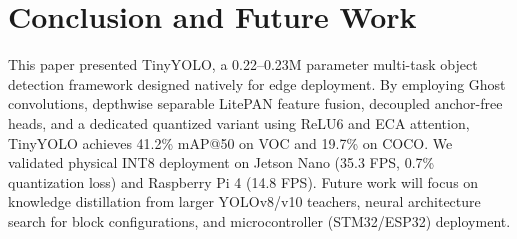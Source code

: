\documentclass[conference]{IEEEtran}
\begin{document}
\section{Conclusion and Future Work}
This paper presented TinyYOLO, a 0.22--0.23M parameter multi-task object detection framework designed natively for edge deployment. By employing Ghost convolutions, depthwise separable LitePAN feature fusion, decoupled anchor-free heads, and a dedicated quantized variant using ReLU6 and ECA attention, TinyYOLO achieves 41.2\% mAP@50 on VOC and 19.7\% on COCO. We validated physical INT8 deployment on Jetson Nano (35.3 FPS, 0.7\% quantization loss) and Raspberry Pi 4 (14.8 FPS). Future work will focus on knowledge distillation from larger YOLOv8/v10 teachers, neural architecture search for block configurations, and microcontroller (STM32/ESP32) deployment.



\end{document}
